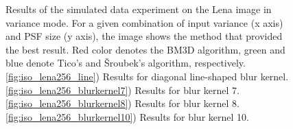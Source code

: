 \documentclass[12pt,notitlepage]{report}
\begin{document}
\begin{figure}[h]
  \caption[Simulated-data experiment on the Lena image in variance mode]{Results of the simulated data experiment on the Lena image in variance mode. For a given combination of input variance (x axis) and PSF size (y axis), the image shows the method that provided the best result. Red color denotes the BM3D algorithm, green and blue denote Tico's and Šroubek's algorithm, respectively. \ref{fig:iso_lena256_line}) Results for diagonal line-shaped blur kernel. \ref{fig:iso_lena256_blurkernel7}) Results for blur kernel 7. \ref{fig:iso_lena256_blurkernel8}) Results for blur kernel 8. \ref{fig:iso_lena256_blurkernel10}) Results for blur kernel 10.}
  \label{fig:var_lena256}
\end{figure}

\clearpage
\end{document}
